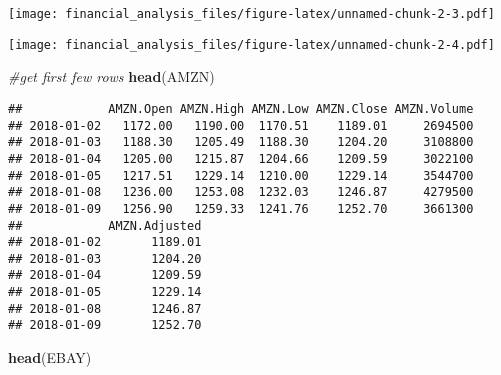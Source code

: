 \documentclass[]{article}
\newenvironment{Shaded}{\begin{snugshade}}{\end{snugshade}}
\newcommand{\KeywordTok}[1]{\textcolor[rgb]{0.13,0.29,0.53}{\textbf{#1}}}
\newcommand{\DataTypeTok}[1]{\textcolor[rgb]{0.13,0.29,0.53}{#1}}
\newcommand{\StringTok}[1]{\textcolor[rgb]{0.31,0.60,0.02}{#1}}
\newcommand{\CommentTok}[1]{\textcolor[rgb]{0.56,0.35,0.01}{\textit{#1}}}
\newcommand{\OperatorTok}[1]{\textcolor[rgb]{0.81,0.36,0.00}{\textbf{#1}}}
\newcommand{\NormalTok}[1]{#1}
\begin{document}
\begin{Shaded}
\end{Shaded}

\texttt{[image: financial\_analysis\_files/figure-latex/unnamed-chunk-2-3.pdf]}

\begin{Shaded}
\end{Shaded}

\texttt{[image: financial\_analysis\_files/figure-latex/unnamed-chunk-2-4.pdf]}

\begin{Shaded}
\begin{Highlighting}[]
\CommentTok{#get first few rows}
\KeywordTok{head}\NormalTok{(AMZN)}
\end{Highlighting}
\end{Shaded}

\begin{verbatim}
##            AMZN.Open AMZN.High AMZN.Low AMZN.Close AMZN.Volume
## 2018-01-02   1172.00   1190.00  1170.51    1189.01     2694500
## 2018-01-03   1188.30   1205.49  1188.30    1204.20     3108800
## 2018-01-04   1205.00   1215.87  1204.66    1209.59     3022100
## 2018-01-05   1217.51   1229.14  1210.00    1229.14     3544700
## 2018-01-08   1236.00   1253.08  1232.03    1246.87     4279500
## 2018-01-09   1256.90   1259.33  1241.76    1252.70     3661300
##            AMZN.Adjusted
## 2018-01-02       1189.01
## 2018-01-03       1204.20
## 2018-01-04       1209.59
## 2018-01-05       1229.14
## 2018-01-08       1246.87
## 2018-01-09       1252.70
\end{verbatim}

\begin{Shaded}
\begin{Highlighting}[]
\KeywordTok{head}\NormalTok{(EBAY)}
\end{Highlighting}
\end{Shaded}
\end{document}
